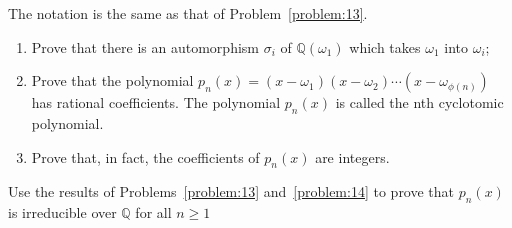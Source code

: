 \begin{problem}\label{problem:14}
The notation is the same as that of Problem~\ref{problem:13}.
\begin{enumerate}
	\item Prove that there is an automorphism $\sigma_{i}$ of $\mathbb{Q}(\omega_{1})$ which takes $\omega_{1}$ into $\omega_{i}$;
	\item Prove that the polynomial $p_{n}(x)=(x-\omega_{1})(x-\omega_{2})\cdots(x-\omega_{\phi(n)})$ has rational coefficients. The polynomial $p_{n}(x)$ is called the nth cyclotomic polynomial.
	\item Prove that, in fact, the coefficients of $p_{n}(x)$ are integers.
\end{enumerate}
\end{problem}

\begin{problem}\label{problem:15}
Use the results of Problems~\ref{problem:13} and~\ref{problem:14} to prove that $p_{n}(x)$ is irreducible over $\mathbb{Q}$ for all $n\geqslant{1}$
\end{problem}
